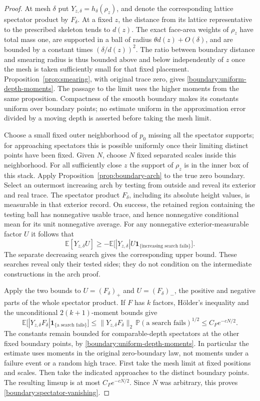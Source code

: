 \documentclass[11pt]{article}
\newcommand{\E}{\mathbb E}
\newcommand{\Prob}{\mathbb P}
\newcommand{\ind}{\mathbf 1}
\theoremstyle{definition}
\theoremstyle{remark}
\numberwithin{equation}{section}
\begin{document}
\begin{proof}
At mesh $\delta$ put $Y_{z,\delta}=h_\delta(\rho_z)$, and denote the
corresponding lattice spectator product by $F_\delta$.
At a fixed $z$, the distance from its lattice representative to the
prescribed skeleton tends to $d(z)$.  The exact face-area weights
of $\rho_z$ have total mass one, are supported in a ball of radius
$\theta d(z)+O(\delta)$, and are bounded by a constant times
$(\delta/d(z))^2$.  The ratio between boundary distance and smearing
radius is thus bounded above and below independently of $z$ once
the mesh is taken sufficiently small for that fixed placement.
Proposition~\ref{prop:smearing}, with original trace zero, gives
\eqref{boundary:uniform-depth-moments}.  The passage to the limit
uses the higher moments from the same proposition.  Compactness
of the smooth boundary makes its constants uniform over boundary
points; no estimate uniform in the approximation error divided by
a moving depth is asserted before taking the mesh limit.

Choose a small fixed outer neighborhood of $p_0$ missing all the
spectator supports; for approaching spectators this is possible
uniformly once their limiting distinct points have been fixed.
Given $N$, choose $N$ fixed separated scales inside this neighborhood.
For all sufficiently close $z$ the support of $\rho_z$ is in the
inner box of this stack.  Apply
Proposition~\ref{prop:boundary-arch} to the true zero boundary.
Select an outermost increasing arch by testing from outside and
reveal its exterior and real trace.  The spectator product $F_\delta$,
including its absolute height values, is measurable in that exterior
record.  On success, the retained region containing the testing
ball has nonnegative usable trace, and hence nonnegative conditional
mean for its unit nonnegative average.  For any nonnegative
exterior-measurable factor $U$ it follows that
\[
 \E[Y_{z,\delta}U]
 \ge -\E\big[|Y_{z,\delta}|U\ind_{\{\text{increasing search fails}\}}\big].
\]
The separate decreasing search gives the corresponding upper bound.
These searches reveal only their tested sides; they do not
condition on the intermediate constructions in the arch proof.

Apply the two bounds to $U=(F_\delta)_+$ and $U=(F_\delta)_-$, the positive and
negative parts of the whole spectator product.  If $F$ has $k$
factors, H\"older's inequality and the unconditional
$2(k+1)$-moment bounds give
\[
 \E\big[|Y_{z,\delta}F_\delta|\ind_{\{\text{a search fails}\}}\big]
 \le \|Y_{z,\delta}F_\delta\|_2\,
       \Prob(\text{a search fails})^{1/2}
 \le C_F e^{-cN/2}.
\]
The constants remain bounded for comparable-depth spectators at
the other fixed boundary points, by
\eqref{boundary:uniform-depth-moments}.  In particular the estimate
uses moments in the original zero-boundary law, not moments under
a failure event or a random high trace.  First take the mesh limit
at fixed positions and scales.  Then take the indicated approaches
to the distinct boundary points.  The resulting limsup is at most
$C_F e^{-cN/2}$.  Since $N$ was arbitrary, this proves
\eqref{boundary:spectator-vanishing}.


\end{proof}
\end{document}

